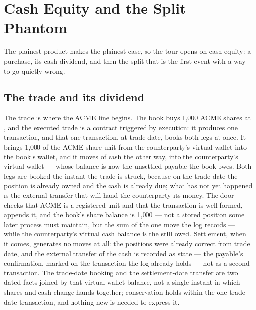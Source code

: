 \section{Cash Equity and the Split Phantom}\label{sec:tour-equity}

The plainest product makes the plainest case, so the tour opens on cash equity: a
purchase, its cash dividend, and then the split that is the first event with a way to
go quietly wrong.

\subsection{The trade and its dividend}

The trade is where the ACME line begins. The book buys 1{,}000 ACME shares at
, and the executed trade is a contract triggered by execution: it produces
one transaction, and that one transaction, at trade date, books both legs at once. It
brings 1{,}000 of the ACME share unit from the counterparty's virtual wallet into the
book's wallet, and it moves  of cash the other way, into the
counterparty's virtual wallet --- whose balance is now the unsettled payable the book
owes. Both legs are booked the instant the trade is struck, because on the trade date
the position is already owned and the cash is already due; what has not yet happened is
the external transfer that will hand the counterparty its money. The door checks that
ACME is a registered unit and that the transaction is well-formed, appends it, and the
book's share balance is 1{,}000 --- not a stored position some later process must
maintain, but the sum of the one move the log records --- while the counterparty's
virtual cash balance is the  still owed. Settlement, when it comes,
generates no moves at all: the positions were already correct from trade date, and the
external transfer of the cash is recorded as state --- the payable's confirmation,
marked on the transaction the log already holds --- not as a second transaction. The trade-date
booking and the settlement-date transfer are two dated facts joined by that
virtual-wallet balance, not a single instant in which shares and cash change hands
together; conservation holds within the one trade-date transaction, and nothing new is
needed to express it.

